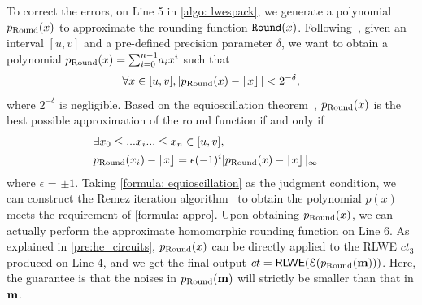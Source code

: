 To correct the errors, on Line 5 in \cref{algo: lwespack}, 
we generate a polynomial $p_{\rm Round}(x)$ to approximate the rounding function $\texttt{Round}(x)$.
Following~\cite{ckksbootsparse}, given an interval $[u,v]$ and a pre-defined 
precision parameter $\delta$, we want to obtain
a polynomial $p_{\rm Round}(x) =  {\textstyle \sum_{i=0}^{n-1}}a_ix^i $ such that
\begin{equation}
\forall x \in [u,v],  |p_{\rm Round}(x)-\left \lceil {x} \right \rfloor | < 2^{-\delta}, \label{formula: appro}
\end{equation}
where $2^{-\delta}$ is negligible.
Based on the equioscillation theorem~\cite{equioscillation}, $p_{\rm Round}(x)$
is the best possible approximation of the round function
if and only if 
\begin{align}
&\exists x_0 \leq ... x_i ... \leq x_n \in [u,v], &\\
&p_{\rm Round}(x_i) - \left \lceil {x} \right \rfloor= \epsilon(-1)^{i}|p_{\rm Round}(x) - \left \lceil {x} \right \rfloor|_{\infty} &
\label{formula: equioscillation}
\end{align}
where $\epsilon$ = $\pm 1$.
Taking \cref{formula: equioscillation} as the judgment condition, 
we can construct the Remez iteration algorithm~\cite{remez} to 
obtain the polynomial $p(x)$ meets the requirement of \cref{formula: appro}.
Upon obtaining $p_{\rm Round}(x)$, we can actually perform
the approximate homomorphic rounding function on Line 6. As
explained in \cref{pre:he_circuits}, $p_{\rm Round}(x)$ can be directly applied
to the RLWE $ct_3$ produced on Line 4, and we get the final output
$ct =  {\mathsf{RLWE}}(\mathcal{E}(p_{\rm Round}({\mathbf{m}})))$. Here, the guarantee
is that the noises in $p_{\rm Round}({\mathbf{m}})$ will strictly be smaller than 
that in ${\mathbf{m}}$.


